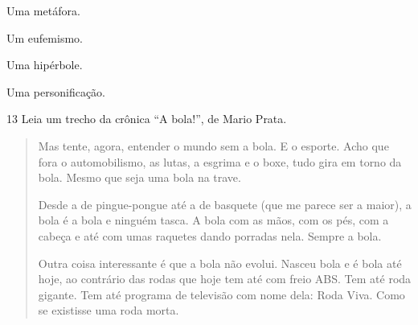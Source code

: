 \begin{escolha}
\item Uma metáfora.
\item Um eufemismo.
\item Uma hipérbole.
\item Uma personificação.
\end{escolha}



\num{13} Leia um trecho da crônica ``A bola!'', de Mario Prata.

\begin{quote}
\noindent Mas tente, agora, entender o mundo sem a bola. E o esporte. Acho que
fora o automobilismo, as lutas, a esgrima e o boxe, tudo gira em torno
da bola. Mesmo que seja uma bola na trave.

Desde a de pingue-pongue até a de basquete (que me parece ser a maior),
a bola é a bola e ninguém tasca. A bola com as mãos, com os pés, com a
cabeça e até com umas raquetes dando porradas nela. Sempre a bola.

Outra coisa interessante é que a bola não evolui. Nasceu bola e é bola
até hoje, ao contrário das rodas que hoje tem até com freio ABS. Tem até
roda gigante. Tem até programa de televisão com nome dela: Roda Viva.
Como se existisse uma roda morta.

\end{quote}

